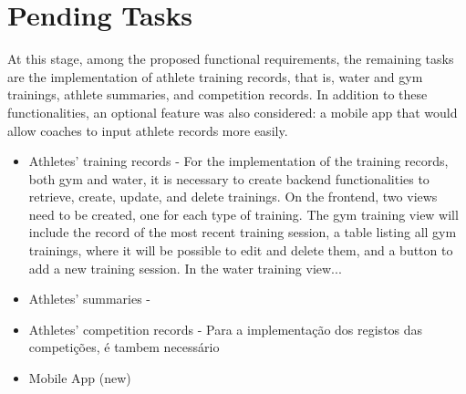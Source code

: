 \documentclass[a4paper,twoside,11pt]{article}
\begin{document}
\section{Pending Tasks}
At this stage, among the proposed functional requirements, the remaining tasks are the implementation of athlete training records, that is, water and gym trainings, athlete summaries, and competition records. In addition to these functionalities, an optional feature was also considered: a mobile app that would allow coaches to input athlete records more easily.

\begin{itemize}
\item Athletes' training records - For the implementation of the training records, both gym and water, it is necessary to create backend functionalities to retrieve, create, update, and delete trainings. On the frontend, two views need to be created, one for each type of training. The gym training view will include the record of the most recent training session, a table listing all gym trainings, where it will be possible to edit and delete them, and a button to add a new training session. In the water training view...

\item Athletes' summaries - 

\item Athletes' competition records - Para a implementação dos registos das competições, é tambem necessário 

\item Mobile App (new)
\end{itemize}

% 
% 
\end{document}
